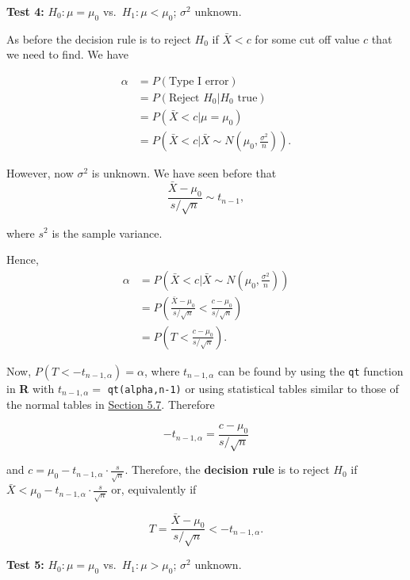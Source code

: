\documentclass[
]{book}
\begin{document}
\leavevmode{}%
{\textbf{Test 4:}} \(H_0: \mu = \mu_0\) vs.~\(H_1: \mu < \mu_0\); \(\sigma^2\) unknown.

As before the decision rule is to reject \(H_0\) if \(\bar{X} < c\) for some cut off value \(c\) that we need to find. We have

\begin{align*}
\alpha &= P(\text{Type I error}) \\[3pt]
&= P(\text{Reject } H_0 | H_0 \text{ true}) \\[3pt]
&= P(\bar{X} < c | \mu = \mu_0) \\[3pt]
&= P\left(\bar{X} <c | \bar{X} \sim N\left(\mu_0, \frac{\sigma^2}{n}\right)\right).
\end{align*}

However, now \(\sigma^2\) is unknown. We have seen before that\\

\[ \frac{\bar{X} - \mu_0}{s/\sqrt{n}} \sim t_{n-1},\]

where \(s^2\) is the sample variance.

Hence,\\

\begin{align*}
\alpha &= P\left(\bar{X} <c | \bar{X} \sim N\left(\mu_0, \frac{\sigma^2}{n}\right)\right) \\ 
&= P \left( \frac{\bar{X} - \mu_0}{s/\sqrt{n}} < \frac{c-\mu_0}{s/\sqrt{n}} \right) \\
&= P \left( T < \frac{c-\mu_0}{s/\sqrt{n}} \right).
\end{align*}

Now, \(P(T < -t_{n-1,\alpha})=\alpha\), where \(t_{n-1,\alpha}\) can be found by using the \texttt{qt} function in \textbf{R} with \(t_{n-1,\alpha} =\) \texttt{qt(alpha,n-1)} or using statistical tables similar to those of the normal tables in \protect\hyperlink{rv:normal}{Section 5.7}. Therefore

\[ -t_{n-1,\alpha} = \frac{c-\mu_0}{s/\sqrt{n}} \]

and \(c = \mu_0 -t_{n-1,\alpha} \cdot \frac{s}{\sqrt{n}}\). Therefore, the {\textbf{decision rule}} is to reject \(H_0\) if \(\bar{X} < \mu_0 -t_{n-1,\alpha} \cdot \frac{s}{\sqrt{n}}\) or, equivalently if

\[T = \frac{\bar{X}-\mu_0}{s/\sqrt{n}} < -t_{n-1,\alpha}.\]

\leavevmode{}%
{\textbf{Test 5:}} \(H_0: \mu = \mu_0\) vs.~\(H_1: \mu > \mu_0\); \(\sigma^2\) unknown.
\end{document}
